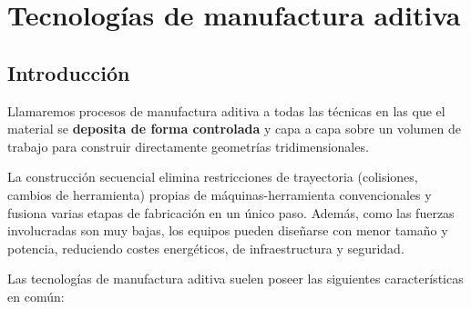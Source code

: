 \chapter{Tecnologías de manufactura aditiva}

\section{Introducción}

Llamaremos procesos de manufactura aditiva a todas las técnicas en las que el material se \textbf
{deposita de forma controlada} y capa a capa sobre un volumen de trabajo para construir directamente geometrías tridimensionales. 

La construcción secuencial elimina restricciones de trayectoria (colisiones, cambios de herramienta) propias de máquinas-herramienta convencionales y fusiona varias etapas de fabricación en un único paso. Además, como las fuerzas involucradas son muy bajas, los equipos pueden diseñarse con menor tamaño y potencia, reduciendo costes energéticos, de infraestructura y seguridad.

Las tecnologías de manufactura aditiva suelen poseer las siguientes características en común:


